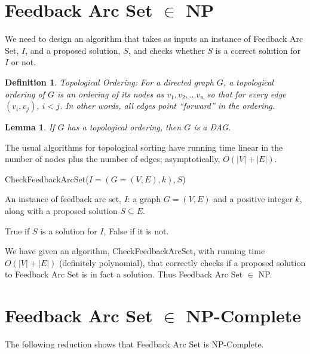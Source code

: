 \documentclass{article}
\newtheorem{lemma}[theorem]{Lemma}
\newtheorem{definition}[theorem]{Definition}
\begin{document}
\section{Feedback Arc Set $\in$ NP}
We need to design an algorithm that takes as inputs an instance of Feedback Arc Set, $I$, and a proposed solution, $S$, and checks whether $S$ is a correct solution for $I$ or not.

\begin{definition}{Topological Ordering:}
For a directed graph $G$, a topological ordering of $G$ is an ordering of its nodes as $v_1, v_2, \dots v_n$ so that for every edge $(v_i,v_j)$, $i < j$. In other words, all edges point “forward” in the ordering.~\cite{kleinberg_algorithm_2006}
\end{definition}

\begin{lemma}
    If $G$ has a topological ordering, then $G$ is a DAG.
\end{lemma}

The usual algorithms for topological sorting have running time linear in the number of nodes plus the number of edges; asymptotically, $O(|V|+|E|)$.

 \begin{algorithm}[H]
  \caption*{{\sc CheckFeedbackArcSet($I = (G=(V,E),k), S$)}}
  \begin{algorithmic}[1]
\INPUT An instance of feedback arc set, $I$: a graph $G = (V,E)$ and a positive integer $k$, along with a proposed solution $S\subseteq E$.

\OUTPUT True if $S$ is a solution for $I$, False if it is not.

\EndIf
{}
\EndIf
{}
  
  \end{algorithmic}
  \end{algorithm}
  
  We have given an algorithm, {\sc CheckFeedbackArcSet}, with running time $O(|V|+|E|)$ (definitely polynomial), that correctly checks if a proposed solution to Feedback Arc Set is in fact a solution. Thus Feedback Arc Set $\in$ NP.

\section{Feedback Arc Set $\in$ NP-Complete}
The following reduction shows that Feedback Arc Set is NP-Complete.
\end{document}
